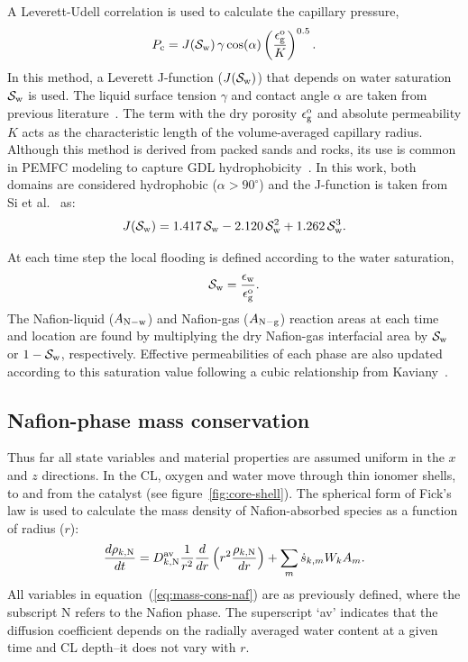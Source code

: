 \documentclass[final,3p,times,twocolumn]{elsarticle}    %
\begin{document}
A Leverett-Udell correlation is used to calculate the capillary pressure,
\begin{equation}
    P_{\rm c} = J({\cal S}_{\rm w})\, \gamma \cos(\alpha) 
    \left( \frac{\epsilon_{\rm g}^{\rm o}}{K} \right)^{0.5}.
\end{equation}
In this method, a Leverett J-function ($J({\cal S}_{\rm w})$) that depends on water saturation ${\cal S}_{\rm w}$ is used. The liquid surface tension $\gamma$ and contact angle $\alpha$ are taken from previous literature~\cite{bib:vetter_2019, bib:sigwadi_2019}. The term with the dry porosity $\epsilon_{\rm g}^{\rm o}$ and absolute permeability $K$ acts as the characteristic length of the volume-averaged capillary radius. Although this method is derived from packed sands and rocks, its use is common in PEMFC modeling to capture GDL hydrophobicity~\cite{bib:si_2015}. In this work, both domains are considered hydrophobic ($\alpha > 90^{\circ}$) and the J-function is taken from Si et al.~\cite{bib:si_2015} as: 
\begin{equation}
    J({\cal S}_{\rm w}) = 1.417\,{\cal S}_{\rm w} - 2.120\,{\cal S}_{\rm w}^2 + 1.262\,{\cal S}_{\rm w}^3.
\end{equation}

At each time step the local flooding is defined according to the water saturation,
\begin{equation}
    {\cal S}_{\rm w} = \frac{\epsilon_{\rm w}}{\epsilon_{\rm g}^{\rm o}}.
\end{equation}
The Nafion-liquid ($A_{\rm N-w}$) and Nafion-gas ($A_{\rm N-g}$) reaction areas at each time and location are found by multiplying the dry Nafion-gas interfacial area by ${\cal S}_{\rm w}$ or $1-{\cal S}_{\rm w}$, respectively. Effective permeabilities of each phase are also updated according to this saturation value following a cubic relationship from Kaviany~\cite{bib:kaviany_2012}. 

\subsection{Nafion-phase mass conservation}

Thus far all state variables and material properties are assumed uniform in the $x$ and $z$ directions. In the CL, 
oxygen and water move through thin ionomer shells, to and from the catalyst (see figure~\ref{fig:core-shell}). The spherical form of Fick's law is used to calculate the mass density of Nafion-absorbed species as a function of radius ($r$):
\begin{equation} \label{eq:mass-cons-naf}
    \frac{d \rho_{k,\rm N}}{d t} = D_{k,\rm N}^{\rm av}
    \frac{1}{r^2} \frac{d}{d r} \left( r^2 \frac{\rho_{k,\rm N}}{dr} \right) 
    + \sum_m \dot{s}_{k,m} W_k A_m.
\end{equation}
All variables in equation~(\ref{eq:mass-cons-naf}) are as previously defined, where the subscript N refers to the Nafion phase. The superscript `av' indicates that the diffusion coefficient depends on the radially averaged water content at a given time and CL depth--it does not vary with $r$.
\end{document}
